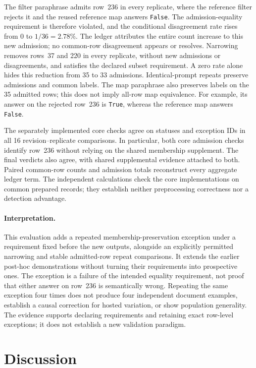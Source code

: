 \documentclass[11pt]{article}
\begin{document}
The filter paraphrase admits row~236 in every replicate, where the reference
filter rejects it and the reused reference map answers \texttt{False}.
The admission-equality requirement is therefore violated, and the conditional
disagreement rate rises from 0 to $1/36=2.78\%$. The ledger attributes the
entire count increase to this new admission; no common-row disagreement
appears or resolves. Narrowing removes rows~37 and 220 in every replicate,
without new admissions or disagreements, and satisfies the declared subset
requirement. A zero rate alone hides this reduction from 35 to 33 admissions.
Identical-prompt repeats preserve admissions and common labels. The map
paraphrase also preserves labels on the 35 admitted rows; this does not imply
all-row map equivalence. For example, its answer on the rejected row~236 is
\texttt{True}, whereas the reference map answers \texttt{False}.

The separately implemented core checks agree on statuses and exception IDs
in all 16 revision--replicate comparisons. In particular, both core admission
checks identify row~236 without relying on the shared membership supplement.
The final verdicts also agree, with shared supplemental evidence attached to
both. Paired common-row counts and admission totals reconstruct every
aggregate ledger term. The independent calculations check the core
implementations on common prepared records; they establish neither
preprocessing correctness nor a detection advantage.

\paragraph{Interpretation.}
This evaluation adds a repeated membership-preservation exception under a
requirement fixed before the new outputs, alongside an explicitly permitted
narrowing and stable admitted-row repeat comparisons. It extends the earlier
post-hoc demonstrations without turning their requirements into prospective
ones. The exception is a failure of the intended equality requirement, not
proof that either answer on row~236 is semantically wrong. Repeating the same
exception four times does not produce four independent document examples,
establish a causal correction for hosted variation, or show population
generality. The evidence supports declaring requirements and retaining exact
row-level exceptions; it does not establish a new validation paradigm.

\section{Discussion}
\end{document}
